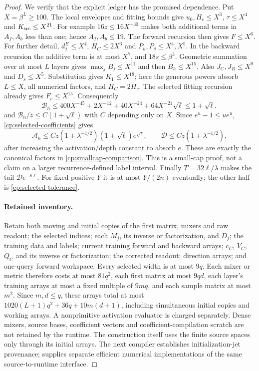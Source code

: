\begin{proof}
We verify that the explicit ledger has the promised dependence.
Put $X=\beta^L\ge100$. The local envelopes and fitting bounds give
$u_0,H_c\le X^3$, $\tau\le X^4$ and $K_{\rm src}\le X^{21}$.
For example $16z\le16X^{-30}$ makes both additional terms in
$A_f,A_b$ less than one; hence $A_f,A_b\le19$.
The forward recursion then gives $F\le X^6$.
For further detail, $d_j^E\le X^4$, $H_C\le2X^3$ and
$P_h,P_\delta\le X^4,X^5$. In the backward recursion the additive
term is at most $X^7$, and $18s\le\beta^3$. Geometric summation
over at most $L$ layers gives $\max_jB_j\le X^{11}$ and then
$B_h\le X^{15}$. Also $J_C,J_R\le X^9$ and $D_s\le X^5$.
Substitution gives $K_1\le X^{18}$; here the generous powers
absorb $L\le X$, all numerical factors, and $H_C=2H_c$.
The selected fitting recursion already gives $F_c\le X^{15}$.
Consequently
\[
 \mathcal B_n\le
 400X^{-45}+2X^{-12}+40X^{-24}
                      +64X^{-21}\sqrt\ell
 \le1+\sqrt\ell,
\]
and $\mathcal B_n/z\le C(1+\sqrt\ell)$ with $C$ depending only
on $X$. Since $e^u-1\le ue^u$, \eqref{cp:selected-coefficients}
gives
\[
 \mathcal A_n\le C z(1+\lambda^{-1/2})
                   (1+\sqrt\ell)e^{\sqrt\ell},\qquad
 \mathcal D\le C z(1+\lambda^{-1/2}),
\]
after increasing the activation/depth constant to absorb $e$.
These are exactly the canonical factors in
\eqref{cp:smallcap-comparison}. This is a small-cap proof,
not a claim on a larger recurrence-defined label interval.
Finally $T=32\ell/\lambda$ makes the tail $\mathcal D e^{-8\ell}$.
For fixed positive $Y$ it is at most $Y/(2n)$ eventually; the other
half is \eqref{cp:selected-tolerance}.

\paragraph{Retained inventory.}
Retain both moving and initial copies of the first matrix, mixers and
raw readout; the selected indices; each $M_j$, its inverse or factorization,
and $D_j$; the training data and labels; current training forward and
backward arrays; $c_C$, $V_C$, $Q_C$ and its inverse or factorization;
the corrected readout; direction arrays; and one-query forward workspace.
Every selected width is at most $9q$. Each mixer or metric therefore
costs at most $81q^2$, each first matrix at most $9qd$, each layer's
training arrays at most a fixed multiple of $9mq$, and each sample
matrix at most $m^2$. Since $m,d\le q$, these arrays total at most
$1020(L+1)q^2+36q+10m(d+1)$, including simultaneous initial copies
and working arrays. A nonprimitive activation evaluator is charged
separately. Dense mixers, source bases, coefficient vectors and
coefficient-compilation scratch are not retained by the runtime.
The construction itself uses the finite source spaces only through
its initial arrays. The next compiler establishes initialization-jet
provenance;  supplies separate efficient numerical
implementations of the same source-to-runtime interface.
\end{proof}

